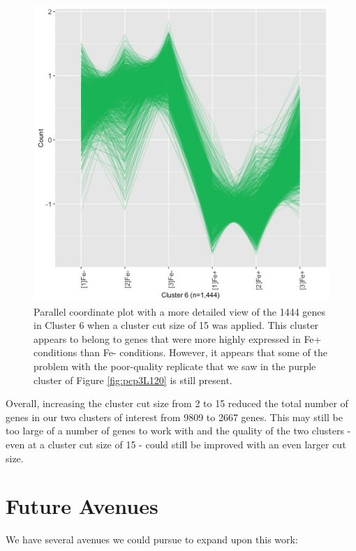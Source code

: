 \documentclass[11pt,a4paper,oldfontcommands,openany]{memoir}
\numberwithin{equation}{section} %
\begin{document}
\begin{figure}[H]
  \begin{framed}
  \centering
  \includegraphics[width=\textwidth]{L120_15_6}
  \end{framed}
  \caption{Parallel coordinate plot with a more detailed view of the 1444 genes in Cluster 6 when a cluster cut size of 15 was applied. This cluster appears to belong to genes that were more highly expressed in Fe+ conditions than Fe- conditions. However, it appears that some of the problem with the poor-quality replicate that we saw in the purple cluster of Figure \ref{fig:pcp3L120} is still present.}
  \label{fig:L120_15_6}
\end{figure}

Overall, increasing the cluster cut size from 2 to 15 reduced the total number of genes in our two clusters of interest from 9809 to 2667 genes. This may still be too large of a number of genes to work with and the quality of the two clusters - even at a cluster cut size of 15 - could still be improved with an even larger cut size.

\section{Future Avenues}

We have several avenues we could pursue to expand upon this work:
\end{document}

